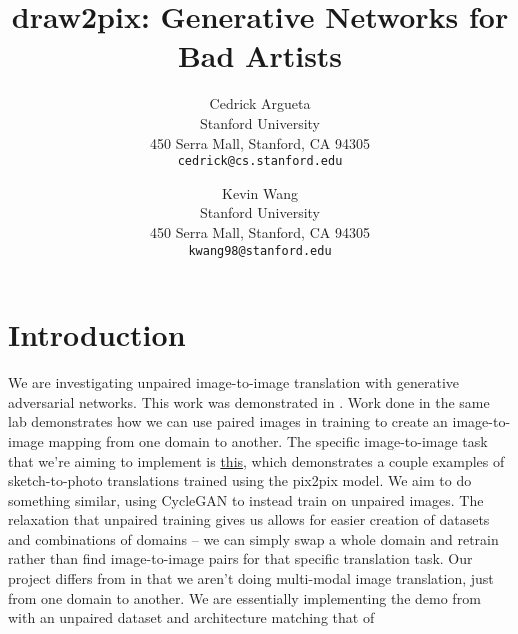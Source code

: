 \documentclass[10pt,twocolumn,letterpaper]{article}
\begin{document}
\title{draw2pix: Generative Networks for Bad Artists}

\author{Cedrick Argueta\\
Stanford University\\
450 Serra Mall, Stanford, CA 94305\\
{\tt\small cedrick@cs.stanford.edu}
\and
Kevin Wang\\
Stanford University\\
450 Serra Mall, Stanford, CA 94305\\
{\tt\small kwang98@stanford.edu}
}

\maketitle

\begin{abstract}
\end{abstract}

\section{Introduction}
We are investigating unpaired image-to-image translation with generative adversarial networks.
This work was demonstrated in \cite{cycleGAN}.
Work done in the same lab \cite{pix2pix} demonstrates how we can use paired images in training to create an image-to-image mapping from one domain to another.
The specific image-to-image task that we're aiming to implement is \href{https://affinelayer.com/pixsrv/}{this}, which demonstrates a couple examples of sketch-to-photo translations trained using the pix2pix model.
We aim to do something similar, using CycleGAN to instead train on unpaired images.
The relaxation that unpaired training gives us allows for easier creation of datasets and combinations of domains -- we can simply swap a whole domain and retrain rather than find image-to-image pairs for that specific translation task.
Our project differs from \cite{bicyclegan} in that we aren't doing multi-modal image translation, just from one domain to another. 
We are essentially implementing the demo from \cite{pix2pix} with an unpaired dataset and architecture matching that of \cite{cycleGAN}
\end{document}
